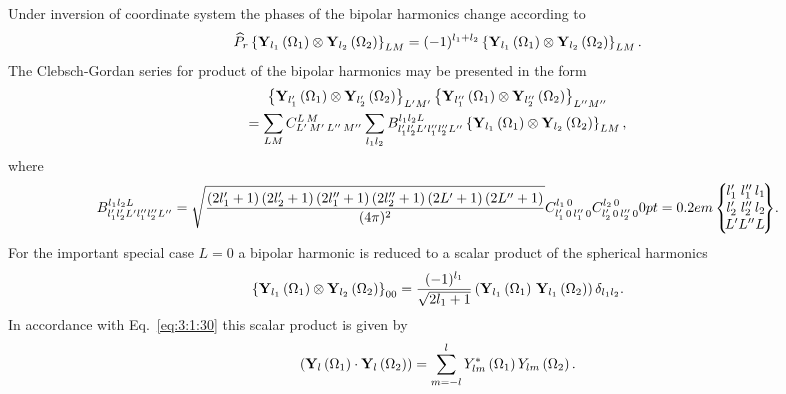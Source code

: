 Under inversion of coordinate system the phases of the bipolar harmonics change according to
\begin{equation}
\widehat{P}_{r}\left\{\mathbf{Y}_{l_{1}}\left(\Omega_{1}\right) \otimes \mathbf{Y}_{l_{2}}\left(\Omega_{2}\right)\right\}_{L M}=(-1)^{l_{1}+l_{2}}\left\{\mathbf{Y}_{l_{1}}\left(\Omega_{1}\right) \otimes \mathbf{Y}_{l_{2}}\left(\Omega_{2}\right)\right\}_{L M}. \label{eq:5:16:6}
\end{equation}
The Clebsch-Gordan series for product of the bipolar harmonics may be presented in the form
\begin{multline}
\left\{\mathbf{Y}_{l_{1}^{\prime}}\left(\Omega_{1}\right) \otimes \mathbf{Y}_{l_{2}^{\prime}}\left(\Omega_{2}\right)\right\}_{L^{\prime} M^{\prime}}\left\{\mathbf{Y}_{l_{1}^{\prime \prime}}\left(\Omega_{1}\right) \otimes \mathbf{Y}_{l_{2}^{\prime \prime}}\left(\Omega_{2}\right)\right\}_{L^{\prime \prime} M^{\prime \prime}} \\
=\sum_{L M} C_{L^{\prime}\,M^{\prime}\,L^{\prime \prime}\,M^{\prime \prime}}^{L\,M} \sum_{l_{1} l_{2}} B_{l_{1}^{\prime} l_{2}^{\prime} L^{\prime} l_{1}^{\prime \prime} l_{2}^{\prime \prime} L^{\prime \prime}}^{l_{1} l_{2} L}\left\{\mathbf{Y}_{l_{1}}\left(\Omega_{1}\right) \otimes \mathbf{Y}_{l_{2}}\left(\Omega_{2}\right)\right\}_{L M}, \label{eq:5:16:7}
\end{multline}
where
\begin{equation}
B_{l_{1}^{\prime} l_{2}^{\prime} L^{\prime} l_{1}^{\prime \prime} l_{2}^{\prime \prime} L^{\prime \prime}}^{l_{1} l_{2} L}=\sqrt{\frac{\left(2 l_{1}^{\prime}+1\right)\left(2 l_{2}^{\prime}+1\right)\left(2 l_{1}^{\prime \prime}+1\right)\left(2 l_{2}^{\prime \prime}+1\right)\left(2 L^{\prime}+1\right)\left(2 L^{\prime \prime}+1\right)}{(4 \pi)^{2}}} \clebsch{l_{1}^{\prime}}{0}{l_{1}^{\prime \prime}}{0}{l_{1}}{0} \clebsch{l_{2}^{\prime}}{0}{l_{2}^{\prime \prime}}{0}{l_{2}}{0}
\ninej%
{l_{1}^{\prime}}{l_{1}^{\prime \prime}}{l_{1}}%
{l_{2}^{\prime}}{l_{2}^{\prime \prime}}{l_{2}}%
{L^{\prime}}{L^{\prime \prime}}{L}
. \label{eq:5:16:8}
\end{equation}
For the important special case $L=0$ a bipolar harmonic is reduced to a scalar product of the spherical harmonics
\begin{equation}
\left\{\mathbf{Y}_{l_{1}}\left(\Omega_{1}\right) \otimes \mathbf{Y}_{l_{2}}\left(\Omega_{2}\right)\right\}_{00}=\frac{(-1)^{l_{1}}}{\sqrt{2 l_{1}+1}}\left(\mathbf{Y}_{l_{1}}\left(\Omega_{1}\right) \, \mathbf{Y}_{l_{1}}\left(\Omega_{2}\right)\right) \delta_{l_{1} l_{2}}. \label{eq:5:16:9}
\end{equation}
In accordance with Eq.~\eqref{eq:3:1:30} this scalar product is given by
\begin{equation}
\left(\mathbf{Y}_{l}\left(\Omega_{1}\right) \cdot \mathbf{Y}_{l}\left(\Omega_{2}\right)\right)=\sum_{m=-l}^{l} Y_{l m}^{*}\left(\Omega_{1}\right) Y_{l m}\left(\Omega_{2}\right). \label{eq:5:16:10}
\end{equation}

